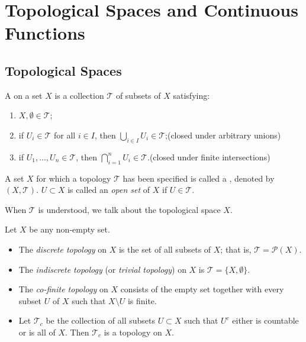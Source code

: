 \chapter{Topological Spaces and Continuous Functions}\label{chap:topological-spaces}
\section{Topological Spaces}
\begin{definition}
A  on a set $X$ is a collection $\mathcal{T}$ of subsets of $X$ satisfying:
\begin{enumerate}[label=(\roman*)]
\item $X,\emptyset\in\mathcal{T}$;
\item if $U_i\in\mathcal{T}$ for all $i\in I$, then $\bigcup_{i\in I}U_i\in\mathcal{T}$;\hfill(closed under arbitrary unions)
\item if $U_1,\dots,U_n\in\mathcal{T}$, then $\bigcap_{i=1}^{n}U_i\in\mathcal{T}$.\hfill(closed under finite intersections)
\end{enumerate}
A set $X$ for which a topology $\mathcal{T}$ has been specified is called a , denoted by $(X,\mathcal{T})$. $U\subset X$ is called an \emph{open set} of $X$ if $U\in\mathcal{T}$.
\end{definition}

\begin{notation}
When $\mathcal{T}$ is understood, we talk about the topological space $X$.
\end{notation}

\begin{example}
Let $X$ be any non-empty set.
\begin{itemize}
\item The \emph{discrete topology} on $X$ is the set of all subsets of $X$; that is, $\mathcal{T}=\mathcal{P}(X)$.
\item The \emph{indiscrete topology} (or \emph{trivial topology}) on $X$ is $\mathcal{T}=\{X,\emptyset\}$.
\item The \emph{co-finite topology} on $X$ consists of the empty set together with every subset $U$ of $X$ such that $X\setminus U$ is finite.
\item Let $\mathcal{T}_c$ be the collection of all subsets $U\subset X$ such that $U^c$ either is countable or is all of $X$. Then $\mathcal{T}_c$ is a topology on $X$.
\end{itemize}
\end{example}

